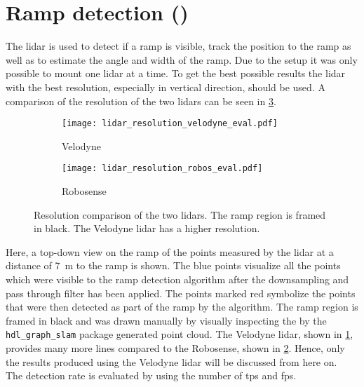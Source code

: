 \newpage
\section{Ramp detection ()}
The \gls{lidar} is used to detect if a ramp is visible, track the position to the ramp as well as to estimate the angle and width of the ramp.
Due to the setup it was only possible to mount one \gls{lidar} at a time.
To get the best possible results the \gls{lidar} with the best resolution, especially in vertical direction, should be used.
A comparison of the resolution of the two \glspl{lidar} can be seen in \cref{fig:lidar_resolution_eval}.
\begin{figure}[htbp]
	\centering
	\begin{subfigure}{1\textwidth}
		\centering
		\texttt{[image: lidar\_resolution\_velodyne\_eval.pdf]}
		\caption{Velodyne}
		\label{fig:lidar_resolution_velodyne_eval}
	\end{subfigure}
	
	\begin{subfigure}{1\textwidth}
		\centering
		\texttt{[image: lidar\_resolution\_robos\_eval.pdf]}
		\caption{Robosense}
		\label{fig:lidar_resolution_robos_eval}
	\end{subfigure}
	\caption{Resolution comparison of the two \glspl{lidar}. The ramp region is framed in black. The Velodyne \gls{lidar} has a higher resolution.}
	\label{fig:lidar_resolution_eval}
\end{figure}
Here, a top-down view on the ramp of the points measured by the \gls{lidar} at a distance of \SI{7}{\metre} to the ramp is shown.
The blue points visualize all the points which were visible to the ramp detection algorithm after the downsampling and pass through filter has been applied.
The points marked red symbolize the points that were then detected as part of the ramp by the algorithm.
The ramp region is framed in black and was drawn manually by visually inspecting the by the \texttt{hdl\_graph\_slam} package generated point cloud.
The Velodyne \gls{lidar}, shown in \cref{fig:lidar_resolution_velodyne_eval}, provides many more lines compared to the Robosense, shown in \cref{fig:lidar_resolution_robos_eval}.
Hence, only the results produced using the Velodyne \gls{lidar} will be discussed from here on.\\
The detection rate is evaluated by using the number of \glspl{tp} and \glspl{fp}.
